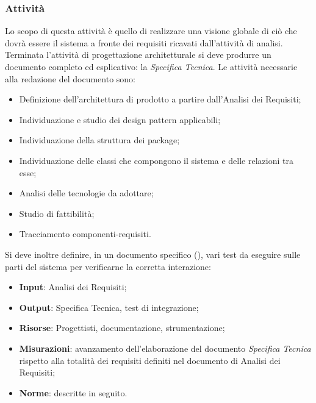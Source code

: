 \subsubsection{Attività}
Lo scopo di questa attività è quello di realizzare una visione globale di ciò che dovrà essere il sistema a fronte dei requisiti ricavati dall’attività di analisi.
Terminata l’attività di progettazione architetturale si deve produrre un documento completo ed esplicativo: la \emph{Specifica Tecnica}.
Le attività necessarie alla redazione del documento sono:
\begin{itemize}
\item Definizione dell’architettura di prodotto a partire dall’Analisi dei Requisiti;
\item Individuazione e studio dei design pattern applicabili;
\item Individuazione della struttura dei package;
\item Individuazione delle classi che compongono il sistema e delle relazioni tra esse;
\item Analisi delle tecnologie da adottare;
\item Studio di fattibilità;
\item Tracciamento componenti-requisiti.
\end{itemize}
Si deve inoltre definire, in un documento specifico  (\href{run:../../Esterni/\fPianoDiQualifica}{\fEscapePianoDiQualifica}), vari
test da eseguire sulle parti del sistema per verificarne la corretta interazione:
\begin{itemize}
\item \textbf{Input}: Analisi dei Requisiti;
\item \textbf{Output}: Specifica Tecnica, test di integrazione;
\item \textbf{Risorse}: Progettisti, documentazione, strumentazione;
\item \textbf{Misurazioni}: avanzamento dell’elaborazione del documento \emph{Specifica Tecnica} rispetto alla totalità dei requisiti definiti nel documento di Analisi dei Requisiti;
\item \textbf{Norme}: descritte in seguito.
\end{itemize}

